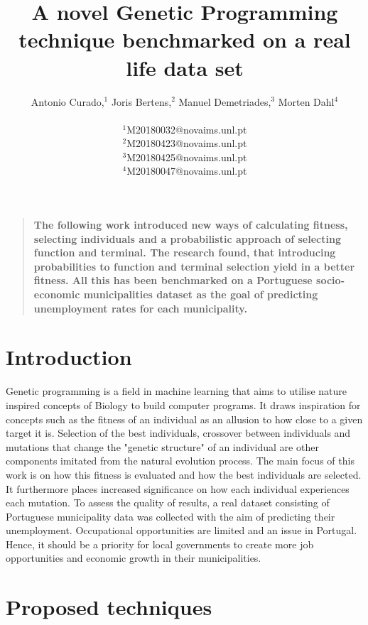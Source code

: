 \documentclass[12pt]{article}
\title{A novel Genetic Programming technique benchmarked on a real life data set}
\author
{Antonio Curado,$^{1}$ Joris Bertens,$^{2}$ Manuel Demetriades,$^{3}$ Morten Dahl$^{4}$\\
\\
\normalsize{$^{1}$M20180032@novaims.unl.pt}\\
\normalsize{$^{2}$M20180423@novaims.unl.pt}\\
\normalsize{$^{3}$M20180425@novaims.unl.pt}\\
\normalsize{$^{4}$M20180047@novaims.unl.pt}\\
}
\date{}
\newenvironment{sciabstract}{%
\begin{quote} \bf}
{\end{quote}}
\begin{document}

\baselineskip15pt


\maketitle




\begin{sciabstract}
The following work introduced new ways of calculating fitness, selecting individuals and a probabilistic approach of selecting function and terminal. The research found, that introducing probabilities to function and terminal selection yield in a better fitness. All this has been benchmarked on a Portuguese socio-economic municipalities dataset as the goal of predicting unemployment rates for each municipality.
\end{sciabstract}

\hfill

\section*{Introduction}
{Genetic programming is a field in machine learning that aims to utilise nature inspired concepts of Biology to build computer programs. It draws inspiration for concepts such as the fitness of an individual as an allusion to how close to a given target it is. Selection of the best individuals, crossover between individuals and mutations that change the "genetic structure" of an individual are other components imitated from the natural evolution process. \hfill \break
The main focus of this work is on how this fitness is evaluated and how the best individuals are selected. It furthermore places increased significance on how each individual experiences each mutation.
To assess the quality of results, a real dataset consisting of Portuguese municipality data was collected with the aim of predicting their unemployment. Occupational opportunities are limited and an issue in Portugal. Hence, it should be a priority for local governments to create more job opportunities and economic growth in their municipalities.
} \hfill \break


\section*{Proposed techniques}
\end{document}
